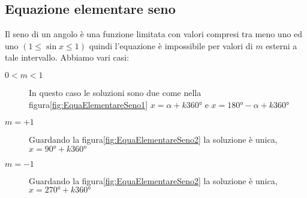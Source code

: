 \subsection{Equazione elementare seno }
Il seno di un angolo è una funzione limitata con valori compresi tra meno uno ed uno $(1\leq\sin x\leq 1)$ quindi l'equazione è impossibile per valori di $m$ esterni a tale intervallo. Abbiamo vari casi:
\begin{description}
	\item[$0<m<1$] In questo caso le soluzioni sono due come nella figura\nobs\vref{fig:EquaElementareSeno1} $x=\alpha+k\ang{360}$ e $x=\ang{180}-\alpha+k\ang{360}$
	\item [$m=+1$] Guardando la figura\nobs\vref{fig:EquaElementareSeno2} la soluzione  è unica, $x=\ang{90}+k\ang{360}$
	\item [$m=-1$] Guardando la figura\nobs\vref{fig:EquaElementareSeno2} la soluzione  è unica, $x=\ang{270}+k\ang{360}$
\end{description} 
\begin{figure}
	\begin{subfigure}[b]{.5\linewidth}
		\centering
			
			\label{fig:EquaElementareSeno1}
	\end{subfigure}%
	\begin{subfigure}[b]{.5\linewidth}
		\centering
		
		\label{fig:EquaElementareCoseno1}
	\end{subfigure}
	\label{fig:EquaElementareSenoCoseno}
\end{figure}
\begin{figure}
	\begin{subfigure}[b]{.5\linewidth}
		\centering
			
			\label{fig:EquaElementareSeno4}
	\end{subfigure}%
	\begin{subfigure}[b]{.5\linewidth}
		\centering
		
		\label{fig:EquaElementareCoseno4}
	\end{subfigure}
	\label{fig:EquaElementareSenoCoseno2}
\end{figure}
